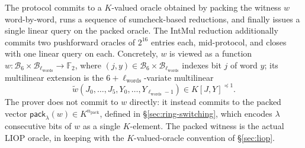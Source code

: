 \documentclass{article}
\theoremstyle{definition}
\newcommand*{\mlin}{{\preceq 1}}
\newcommand*{\mle}{\widetilde}
\newcommand{\BB}{\mathcal{B}}
\newcommand{\FF}[1]{\mathbb{F}_{#1}}
\begin{document}
The protocol commits to a $K$-valued oracle obtained by packing the witness $w$ word-by-word, runs a sequence of sumcheck-based reductions, and finally issues a single linear query on the packed oracle. The IntMul reduction additionally commits two pushforward oracles of $2^{16}$ entries each, mid-protocol, and closes with one linear query on each. Concretely, $w$ is viewed as a function $w \colon \BB_6 \times \BB_{\ell_\text{words}} \to \FF{2}$, where $(j, y) \in \BB_6 \times \BB_{\ell_\text{words}}$ indexes bit $j$ of word $y$; its multilinear extension is the $6 + \ell_\text{words}$-variate multilinear
\[
  \mle{w}(J_0, \ldots, J_5, Y_0, \ldots, Y_{\ell_\text{words} - 1}) \in K[J, Y]^\mlin.
\]
The prover does not commit to $w$ directly: it instead commits to the packed vector $\textsf{pack}_\lambda(w) \in K^{n_\text{pack}}$, defined in \S\ref{sec:ring-switching}, which encodes $\lambda$ consecutive bits of $w$ as a single $K$-element. The packed witness is the actual LIOP oracle, in keeping with the $K$-valued-oracle convention of \S\ref{sec:liop}.
\end{document}
